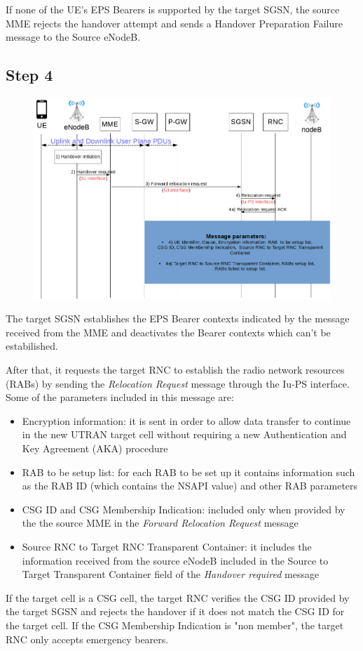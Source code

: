 If none of the UE's EPS Bearers is supported by the target SGSN, the source MME
 rejects the handover attempt and sends a Handover Preparation Failure message to the
 Source eNodeB.


\subsection*{Step 4}
\begin{figure}[!htb]
	\centering
	\includegraphics[width=0.9\linewidth]{img/preparation-4.png}
	\label{fig:5}
\end{figure}
The target SGSN establishes the EPS Bearer contexts indicated by the message
received from the MME and deactivates the Bearer contexts which can't be
estabilished.

After that, it requests the target RNC to establish the radio
network resources (RABs) by sending the
\emph{Relocation Request} message through the Iu-PS interface. Some of the
parameters included in this message are:
\begin{itemize}
	\item Encryption information: it is sent in order to allow data transfer to
	continue in the new UTRAN target cell without requiring a new Authentication
	and Key Agreement (AKA) procedure
	\item RAB to be setup list: for each RAB to be set up it contains information
	such as the RAB ID (which contains the NSAPI value) and other RAB parameters
	\item CSG ID and CSG Membership Indication: included only when provided by
	the the source MME in the \emph{Forward Relocation Request} message
	\item Source RNC to Target RNC Transparent Container: it includes the information
	received from the source eNodeB included in the Source to Target Transparent
	Container field of the \emph{Handover required} message
\end{itemize}
If the target cell is a CSG cell, the target RNC verifies the CSG ID provided
by the target SGSN and rejects the handover if it does not match the CSG ID for
the target cell. If the CSG Membership Indication is "non member", the target
RNC only accepts emergency bearers.



